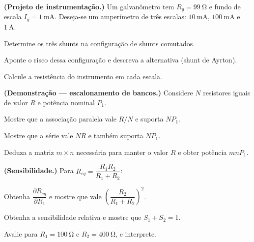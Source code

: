 \blocodesafio
\begin{questao}[4]{}

\textbf{(Projeto de instrumentação.)} Um galvanômetro tem $R_g=\SI{99}{\ohm}$ e
fundo de escala $I_g=\SI{1}{\milli\ampere}$. Deseja-se um amperímetro de três
escalas: $\SI{10}{\milli\ampere}$, $\SI{100}{\milli\ampere}$ e
$\SI{1}{\ampere}$.
\begin{itensq}
\item Determine os três shunts na configuração de shunts comutados.
\item Aponte o risco dessa configuração e descreva a alternativa (shunt de
      Ayrton).
\item Calcule a resistência do instrumento em cada escala.
\end{itensq}


\end{questao}
\begin{questao}[4]{}

\textbf{(Demonstração --- escalonamento de bancos.)} Considere $N$ resistores
iguais de valor $R$ e potência nominal $P_1$.
\begin{itensq}
\item Mostre que a associação paralela vale $R/N$ e suporta $NP_1$.
\item Mostre que a série vale $NR$ e também suporta $NP_1$.
\item Deduza a matriz $m\times n$ necessária para manter o valor $R$ e obter
      potência $mnP_1$.
\end{itensq}


\end{questao}
\begin{questao}[4]{}

\textbf{(Sensibilidade.)} Para $R_{eq}=\dfrac{R_1R_2}{R_1+R_2}$:
\begin{itensq}
\item Obtenha $\dfrac{\partial R_{eq}}{\partial R_1}$ e mostre que vale
      $\left(\dfrac{R_2}{R_1+R_2}\right)^{2}$.
\item Obtenha a sensibilidade relativa e mostre que
      $S_1+S_2=1$.
\item Avalie para $R_1=\SI{100}{\ohm}$ e $R_2=\SI{400}{\ohm}$, e interprete.
\end{itensq}


\end{questao}
